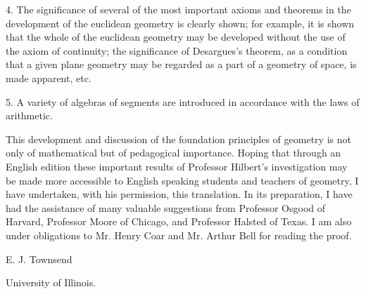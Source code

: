\documentclass[11pt,oneside]{book}
\begin{document}
\begin{small}
4. The significance of several of the most important axioms
and theorems in the development of the euclidean geometry is
clearly shown; for example, it is shown that the whole of the
euclidean geometry may be developed without the use of the axiom
of continuity; the significance of Desargues's theorem, as a condition
that a given plane geometry may be regarded as a part of a
geometry of space, is made apparent, etc.

5. A variety of algebras of segments are introduced in accordance
with the laws of arithmetic.

This development and discussion of the foundation principles
of geometry is not only of mathematical but of pedagogical importance.
Hoping that through an English edition these important
results of Professor Hilbert's investigation may be made more
accessible to English speaking students and teachers of geometry,
I have undertaken, with his permission, this translation. In its
preparation, I have had the assistance of many valuable suggestions
from Professor Osgood of Harvard, Professor Moore of Chicago,
and Professor Halsted of Texas. I am also under obligations
to Mr. Henry Coar and Mr. Arthur Bell for reading the
proof.

\begin{scshape}
\begin{flushright}
E. J. Townsend
\end{flushright}
University of Illinois.
\end{scshape}
\end{small}
\clearpage
\end{document}
